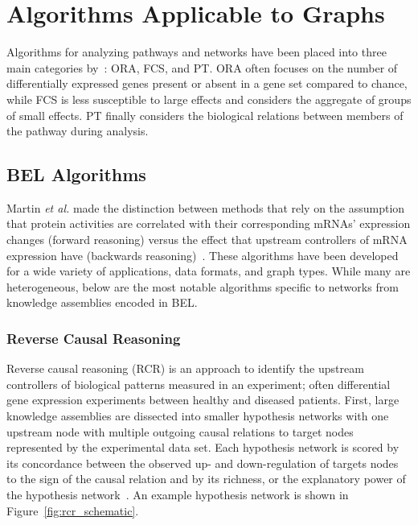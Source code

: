 \section{Algorithms Applicable to Graphs}
\label{sec:algorithms}

Algorithms for analyzing pathways and networks have been placed into three main categories by~\cite{Khatri2012}: \ac{ORA}, \ac{FCS}, and \ac{PT}.
\ac{ORA} often focuses on the number of differentially expressed genes present or absent in a gene set compared to chance, while \ac{FCS} is less susceptible to large effects and considers the aggregate of groups of small effects.
\ac{PT} finally considers the biological relations between members of the pathway during analysis.

\subsection{BEL Algorithms}
\label{subsec:bel_algorithms}

Martin \textit{et al.} made the distinction between methods that rely on the assumption that protein activities are correlated with their corresponding mRNAs' expression changes (forward reasoning) versus the effect that upstream controllers of mRNA expression have (backwards reasoning)~\cite{Martin2014}.
These algorithms have been developed for a wide variety of applications, data formats, and graph types.
While many are heterogeneous, below are the most notable algorithms specific to networks from knowledge assemblies encoded in BEL.

\subsubsection{Reverse Causal Reasoning}

Reverse causal reasoning (\ac{RCR}) is an approach to identify the upstream controllers of biological patterns measured in an experiment; often differential gene expression experiments between healthy and diseased patients.
First, large knowledge assemblies are dissected into smaller hypothesis networks with one upstream node with multiple outgoing causal relations to target nodes represented by the experimental data set.
Each hypothesis network is scored by its concordance between the observed up- and down-regulation of targets nodes to the sign of the causal relation and by its richness, or the explanatory power of the hypothesis network~\cite{Catlett2013}.
An example hypothesis network is shown in Figure~\ref{fig:rcr_schematic}.

